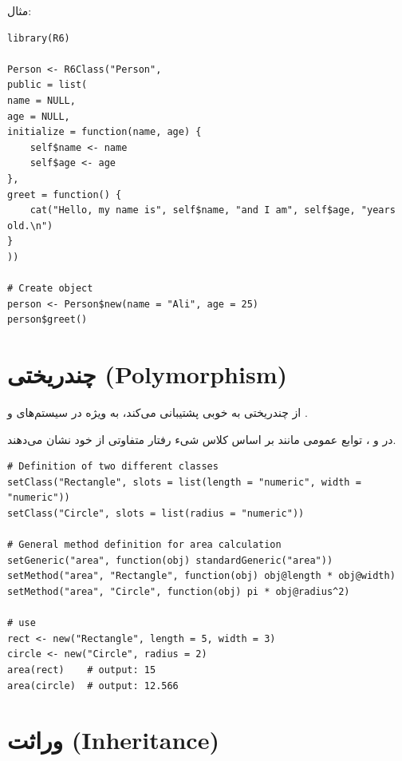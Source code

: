 \documentclass[11pt, a4paper, oneside]{book}
\begin{document}
\begin{itemize}
\begin{itemize}
		 		\end{itemize}
		 		
		 		مثال:
		 		
		 		\begin{latin}
		 			\begin{lstlisting}[caption={\lr{S6 OOP}}] 
library(R6)

Person <- R6Class("Person",
public = list(
name = NULL,
age = NULL,
initialize = function(name, age) {
	self$name <- name
	self$age <- age
},
greet = function() {
	cat("Hello, my name is", self$name, "and I am", self$age, "years old.\n")
}
))

# Create object
person <- Person$new(name = "Ali", age = 25)
person$greet()

		 			\end{lstlisting}
		 		\end{latin}
		 		
		 		
		 	\end{itemize}
		 
		 \section{چندریختی (Polymorphism)}
		 	
		 	از چندریختی به خوبی پشتیبانی می‌کند، به ویژه در سیستم‌های  و .
		 	
			 	در  و ، توابع عمومی مانند  بر اساس کلاس شیء رفتار متفاوتی از خود نشان می‌دهند.
			 	
			 	\begin{latin}
			 		\begin{lstlisting}[caption={\lr{Polymorphism}}] 
# Definition of two different classes
setClass("Rectangle", slots = list(length = "numeric", width = "numeric"))
setClass("Circle", slots = list(radius = "numeric"))

# General method definition for area calculation
setGeneric("area", function(obj) standardGeneric("area"))
setMethod("area", "Rectangle", function(obj) obj@length * obj@width)
setMethod("area", "Circle", function(obj) pi * obj@radius^2)

# use
rect <- new("Rectangle", length = 5, width = 3)
circle <- new("Circle", radius = 2)
area(rect)    # output: 15
area(circle)  # output: 12.566

			 		\end{lstlisting}
			 	\end{latin}
		 
		 \section{وراثت (Inheritance)}
		 
\end{document}

